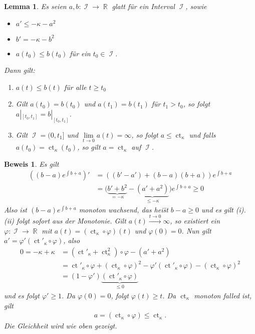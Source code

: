 \documentclass[paper=A4, twoside, chapterprefix=true, bibliography=totoc, headsepline]{scrbook}
\let\temp\phi{}
\let\phi\varphi{}
\let\varphi\temp{}
\let\temp\theta{}
\let\theta\vartheta{}
\let\vartheta\temp{}
\let\temp\epsilon{}
\let\epsilon\varepsilon{}
\let\varepsilon\temp{}
\let\temp\rho{}
\let\rho\varrho{}
\let\varrho\temp{}
\DeclareMathOperator{\R}{\mathbb{R}}
\DeclareMathOperator{\calI}{\mathcal{I}}
\DeclareMathOperator{\ct}{ct}       %
\theoremstyle{plain}
\newtheorem{Lemma}[Dfn]{Lemma}
\theoremstyle{nonumberplain}
\newtheorem{bew}{Beweis}
\theoremstyle{empty}
\theoremstyle{break}
\begin{document}
\begin{Lemma}\label{thm:lemma-9-16}
  Es seien $a,b \colon \calI \to \R$ glatt f\"ur ein Interval $\calI$, sowie
  \begin{itemize}
  \item $a' \leq -\kappa - a^2$
  \item $b' = -\kappa - b^2$
  \item $a(t_0) \leq b(t_0)$ f\"ur ein $t_0 \in \calI$.
  \end{itemize}
  Dann gilt:
  \begin{enumerate}[label=(\roman*)]
  \item $a(t) \leq b(t)$ f\"ur alle $t \ge t_0$
  \item Gilt $a(t_0) = b(t_0)$ und $a(t_1) = b(t_1)$ f\"ur $t_1 > t_0$, so folgt $a|_{[t_0,t_1]} = b|_{[t_0,t_1]}$.
  \item Gilt $\calI = (0,t_1]$ und $\lim\limits_{t \to 0}a(t) = \infty$, so folgt $a \leq \ct_{\kappa}$ und falls $a(t_0) = \ct_{\kappa}(t_0)$, so gilt $a = \ct_{\kappa}$ auf $\calI$.
  \end{enumerate}
\end{Lemma}

\begin{bew}
  Es gilt
  \begin{align*}
    \left((b-a)e^{\int b+a}\right)'
    & = \left((b'-a') + (b-a)(b+a)\right)e^{\int b+a} \\
    & = \big(\underbrace{b'+b^2}_{= -\kappa} - \underbrace{(a' + a^2)}_{\leq - \kappa}\big)e^{\int b+a}
    \geq 0
  \end{align*}
  Also ist $(b-a)e^{\int b+a}$ monoton wachsend, das hei\"st $b-a \geq 0$ und es gilt (i). (ii) folgt sofort aus der Monotonie.
  Gilt $a(t) \xrightarrow{t\to 0} \infty$, so existiert ein $\phi \colon \calI \to \R$ mit $a(t) = (\ct_{\kappa}\circ \phi)(t)$ und $\phi(0) = 0$.
  Nun gilt $a' = \phi'(\ct'_{\kappa} \circ \phi)$, also
  \begin{align*}
    0 = -\kappa + \kappa
    & = (\ct'_{\kappa} + \ct_{\kappa}^2) \circ \phi - (a' + a^2)\\
    & = \ct'_{\kappa} \circ \phi + (\ct_{\kappa} \circ \phi)^2 - \phi'(\ct'_{\kappa} \circ \phi) - (\ct_{\kappa} \circ \phi)^2\\
    & = (1-\phi')\underbrace{(\ct'_{\kappa} \circ \phi)}_{\leq 0}
  \end{align*}
  und es folgt $\phi' \geq 1$.
  Da $\phi(0) = 0$, folgt $\phi(t) \geq t$.
  Da $\ct_{\kappa}$ monoton falled ist, gilt
  \begin{align*}
    a = (\ct_{\kappa} \circ \phi) \leq \ct_{\kappa}.
  \end{align*}
  Die Gleichheit wird wie oben gezeigt.
\end{bew}
\end{document}
